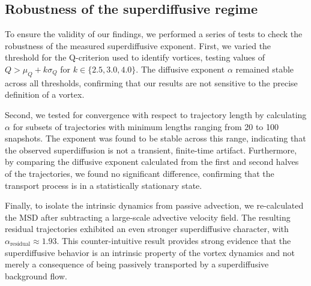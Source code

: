 \documentclass[]{article}
\begin{document}
\subsection{Robustness of the superdiffusive regime}
To ensure the validity of our findings, we performed a series of tests to check the robustness of the measured superdiffusive exponent. First, we varied the threshold for the Q-criterion used to identify vortices, testing values of $Q > \mu_Q + k\sigma_Q$ for $k \in \{2.5, 3.0, 4.0\}$. The diffusive exponent $\alpha$ remained stable across all thresholds, confirming that our results are not sensitive to the precise definition of a vortex.

Second, we tested for convergence with respect to trajectory length by calculating $\alpha$ for subsets of trajectories with minimum lengths ranging from 20 to 100 snapshots. The exponent was found to be stable across this range, indicating that the observed superdiffusion is not a transient, finite-time artifact. Furthermore, by comparing the diffusive exponent calculated from the first and second halves of the trajectories, we found no significant difference, confirming that the transport process is in a statistically stationary state.

Finally, to isolate the intrinsic dynamics from passive advection, we re-calculated the MSD after subtracting a large-scale advective velocity field. The resulting residual trajectories exhibited an even stronger superdiffusive character, with $\alpha_{\text{residual}} \approx 1.93$. This counter-intuitive result provides strong evidence that the superdiffusive behavior is an intrinsic property of the vortex dynamics and not merely a consequence of being passively transported by a superdiffusive background flow.
\end{document}
